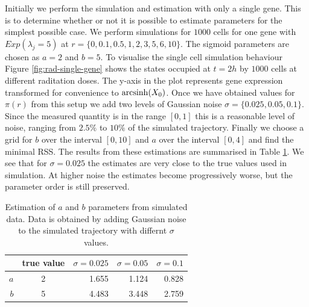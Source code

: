 Initially we perform the simulation and estimation with only a single gene. This is to determine whether or not it is possible to estimate parameters for the simplest possible case. We perform simulations for $1000$ cells for one gene with $Exp(\lambda_j = 5)$ at $r = \lbrace 0, 0.1, 0.5, 1, 2, 3, 5, 6, 10 \rbrace$. The sigmoid parameters are chosen as $a = 2$ and $b = 5$. To visualise the single cell simulation behaviour Figure \ref{fig:rad-single-gene} shows the states occupied at $t = 2h$ by $1000$ cells at different raditation doses. The y-axis in the plot represents gene expression transformed for convenience to $\operatorname{arcsinh}(X_0)$. Once we have obtained values for $\pi(r)$ from this setup we add two levels of Gaussian noise $\sigma = \lbrace 0.025, 0.05, 0.1 \rbrace$. Since the measured quantity is in the range $[0, 1]$ this is a reasonable level of noise, ranging from $2.5 \%$ to $10 \%$ of the simulated trajectory. Finally we choose a grid for $b$ over the interval $[0, 10]$ and $a$ over the interval $[0, 4]$ and find the minimal RSS. The results from these estimations are summarised in Table \ref{tab:fit-cc-single}. We see that for $\sigma = 0.025$ the estimates are very close to the true values used in simulation. At higher noise the estimates become progressively worse, but the parameter order is still preserved. 

\begin{table}[!t]
    \centering
\begin{tabular}{r||c|rrr}
  \hline \hline
   & true value & $\sigma = 0.025$ & $\sigma = 0.05$ & $\sigma = 0.1$ \\ 
  \hline
  $a$ & 2 & 1.655 & 1.124 & 0.828 \\ 
  $b$ & 5 & 4.483 & 3.448 & 2.759 \\ 
   \hline
 \end{tabular}
 \caption{Estimation of $a$ and $b$ parameters from simulated data. Data is obtained by adding Gaussian noise to the simulated trajectory with differnt $\sigma$ values. }
 \label{tab:fit-cc-single}
\end{table}

